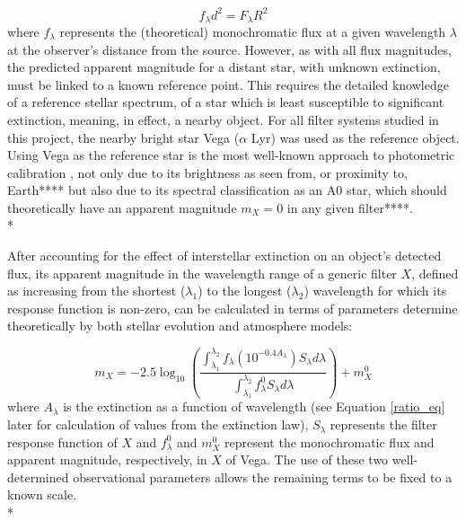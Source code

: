 \documentclass[12pt, a4paper]{report}
\begin{document}
\begin{equation}
f_{\lambda}d^{2}=F_{\lambda}R^{2}
\label{flux_dist_rd}
\end{equation}
where $f_{\lambda}$ represents the (theoretical) monochromatic flux at a given wavelength $\lambda$ at the observer's distance from the source. However, as with all flux magnitudes, the predicted apparent magnitude for a distant star, with unknown extinction,  must be linked to a known reference point. This requires the detailed knowledge of a reference stellar spectrum, of a star which is least susceptible to significant extinction, meaning, in effect, a nearby object. For all filter systems studied in this project, the nearby bright star Vega ($\alpha$ Lyr) was used as the reference object. Using Vega as the reference star is the most well-known approach to photometric calibration \citep{2014MNRAS.444..392C}, not only due to its brightness as seen from, or proximity to, Earth**** but also due to its spectral classification as an A0 star, which should theoretically have an apparent magnitude $m_{X} = 0$ in any given filter****.\\*

After accounting for the effect of interstellar extinction on an object's detected flux, its apparent magnitude in the wavelength range of a generic filter $X$, defined as increasing from the shortest ($\lambda_{1}$) to the longest ($\lambda_{2}$) wavelength for which its response function is non-zero, can be calculated in terms of parameters determine theoretically by both stellar evolution and atmosphere models:

\begin{equation}
m_{X} = -2.5 \log_{10} \left(\frac{ \int_{\lambda_{1}}^{\lambda_{2}} f_{\lambda} \left( 10^{-0.4 A_{\lambda}} \right) S_{\lambda} d\lambda }{ \int_{\lambda_{1}}^{\lambda_{2}} f_{\lambda}^{0} S_{\lambda} d\lambda }\right) + m_{X}^{0}
\label{app_mag_def}
\end{equation}
where $A_{\lambda}$ is the extinction as a function of wavelength (see Equation \ref{ratio_eq} later for calculation of values from the \cite{1989ApJ...345..245C} extinction law), $S_{\lambda}$ represents the filter response function of $X$ and $f_{\lambda}^{0}$ and $m_{X}^{0}$ represent the monochromatic flux and apparent magnitude, respectively, in $X$ of Vega. The use of these two well-determined observational parameters allows the remaining terms to be fixed to a known scale.\\*

\end{document}
